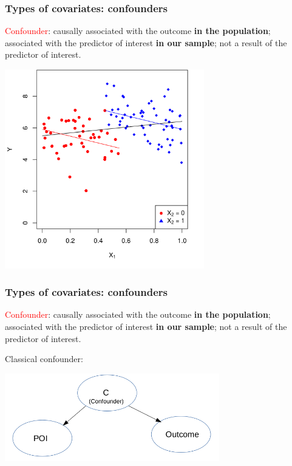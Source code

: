\documentclass[12pt, 
hyperref={colorlinks=true, linkcolor=blue, urlcolor=cyan}]{beamer}
\begin{document}
\begin{frame}
\frametitle{Types of covariates: confounders}

\textcolor{red}{Confounder}: causally associated with the outcome \textbf{in the population}; associated with the predictor of interest \textbf{in our sample}; not a result of the predictor of interest.

\centering
\vspace{-0.1cm}
\includegraphics[width=0.65\textwidth]{plots/confounding_colored_with_lines.png}

\end{frame}

\begin{frame}
\frametitle{Types of covariates: confounders}
\textcolor{red}{Confounder}: causally associated with the outcome \textbf{in the population}; associated with the predictor of interest \textbf{in our sample}; not a result of the predictor of interest.

Classical confounder:

\begin{center}
\includegraphics[width=0.7\textwidth]{plots/classical_confounder.png}
\end{center}

\end{frame}
\end{document}
